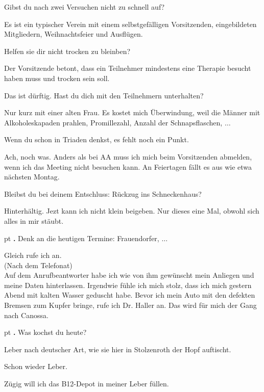 \documentclass[10pt,a4paper]{article}
\newcounter{notec}
\newcommand\notep[1]{%
  \stepcounter{notec}
  \vskip #1pt
  {\bf\arabic{notec}.}
}
\begin{document}
\begin{mdframed}[style=daystyle]
  \vskip 2pt
  Gibst du nach zwei Versuchen nicht zu schnell auf?
  
  \vskip 2pt
  Es ist ein typischer Verein mit einem selbstgefälligen Vorsitzenden,
  eingebildeten Mitgliedern, Weihnachtsfeier und Ausflügen.
  
  \vskip 2pt
  Helfen sie dir nicht trocken zu bleinben?
  
  \vskip 2pt
  Der Vorsitzende betont, dass ein Teilnehmer mindestens eine Therapie
  besucht haben muss und trocken sein soll.
  
  \vskip 2pt
  Das ist dürftig. Hast du dich mit den Teilnehmern unterhalten?
  
  \vskip 2pt
  Nur kurz mit einer alten Frau. Es kostet mich Überwindung, weil die Männer
  mit Alkoholeskapaden prahlen, Promillezahl, Anzahl der Schnapsflaschen, $\ldots$
  
  \vskip 2pt
  Wenn du schon in Triaden denkst, es fehlt noch ein Punkt.
  
  \vskip 2pt
  Ach, noch was. Anders als bei AA muss ich mich beim Vorsitzenden abmelden,
  wenn ich das Meeting nicht besuchen kann. An Feiertagen fällt es aus wie
  etwa nächsten Montag.
  
  \vskip 2pt
  Bleibst du bei deinem Entschluss: Rückzug ins Schneckenhaus?
  
  \vskip 2pt
  Hinterhältig. Jezt kann ich nicht klein beigeben. Nur dieses eine Mal,
  obwohl sich alles in mir stäubt.
  
  \notep 4 Denk an die heutigen Termine: Frauendorfer, $\ldots$
  
  \vskip 2pt
  Gleich rufe ich an. \\
  (Nach dem Telefonat) \\
  Auf dem Anrufbeantworter habe ich wie von ihm gewünscht mein Anliegen und
  meine Daten hinterlassen. Irgendwie fühle ich mich stolz, dass ich mich
  gestern Abend mit kalten Wasser geduscht habe. Bevor ich mein Auto mit den
  defekten Bremsen zum Kupfer bringe, rufe ich Dr. Haller an. Das wird für mich
  der Gang nach Canossa.
  
  \notep 4 Was kochst du heute?
  
  \vskip 2pt
  Leber nach deutscher Art, wie sie hier in Stolzenroth der Hopf auftischt.
  
  \vskip 2pt
  Schon wieder Leber.
  
  \vskip 2pt
  Zügig will ich das B12-Depot in meiner Leber füllen.
  
\end{mdframed}
\end{document}
